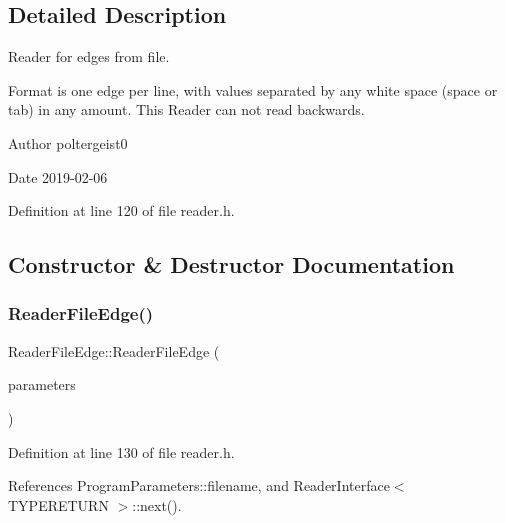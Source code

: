 \subsection{Detailed Description}
Reader for edges from file. 

Format is one edge per line, with values separated by any white space (space or tab) in any amount. This Reader can not read backwards.

\begin{DoxyAuthor}{Author}
poltergeist0
\end{DoxyAuthor}
\begin{DoxyDate}{Date}
2019-\/02-\/06 
\end{DoxyDate}


Definition at line 120 of file reader.\+h.



\subsection{Constructor \& Destructor Documentation}
\mbox{\label{classReaderFileEdge_a519fd6f5c53a07c2019a36519ca68ea7}} 
\subsubsection{\texorpdfstring{Reader\+File\+Edge()}{ReaderFileEdge()}}
{\footnotesize\ttfamily Reader\+File\+Edge\+::\+Reader\+File\+Edge (\begin{DoxyParamCaption}\item[{const \hyperlink{structProgramParameters}{Program\+Parameters} \&}]{parameters }\end{DoxyParamCaption})\hspace{0.3cm}{\ttfamily [inline]}}



Definition at line 130 of file reader.\+h.



References Program\+Parameters\+::filename, and Reader\+Interface$<$ T\+Y\+P\+E\+R\+E\+T\+U\+R\+N $>$\+::next().

